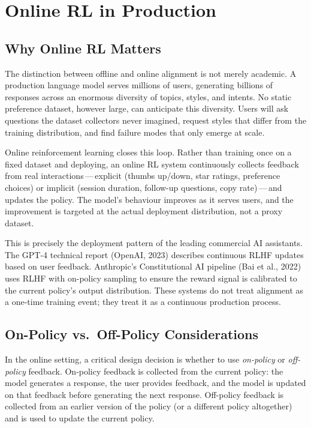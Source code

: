 \section{Online RL in Production}
\label{sec:online-rl-production}

\subsection{Why Online RL Matters}

The distinction between offline and online alignment is not merely academic. A production language model serves millions of users, generating billions of responses across an enormous diversity of topics, styles, and intents. No static preference dataset, however large, can anticipate this diversity. Users will ask questions the dataset collectors never imagined, request styles that differ from the training distribution, and find failure modes that only emerge at scale.

Online reinforcement learning closes this loop. Rather than training once on a fixed dataset and deploying, an online RL system continuously collects feedback from real interactions\,---\,explicit (thumbs up/down, star ratings, preference choices) or implicit (session duration, follow-up questions, copy rate)\,---\,and updates the policy. The model's behaviour improves as it serves users, and the improvement is targeted at the actual deployment distribution, not a proxy dataset.

This is precisely the deployment pattern of the leading commercial AI assistants. The GPT-4 technical report (OpenAI, 2023) describes continuous RLHF updates based on user feedback. Anthropic's Constitutional AI pipeline (Bai et al., 2022) uses RLHF with on-policy sampling to ensure the reward signal is calibrated to the current policy's output distribution. These systems do not treat alignment as a one-time training event; they treat it as a continuous production process.

\subsection{On-Policy vs.\ Off-Policy Considerations}

In the online setting, a critical design decision is whether to use \emph{on-policy} or \emph{off-policy} feedback. On-policy feedback is collected from the current policy: the model generates a response, the user provides feedback, and the model is updated on that feedback before generating the next response. Off-policy feedback is collected from an earlier version of the policy (or a different policy altogether) and is used to update the current policy.

